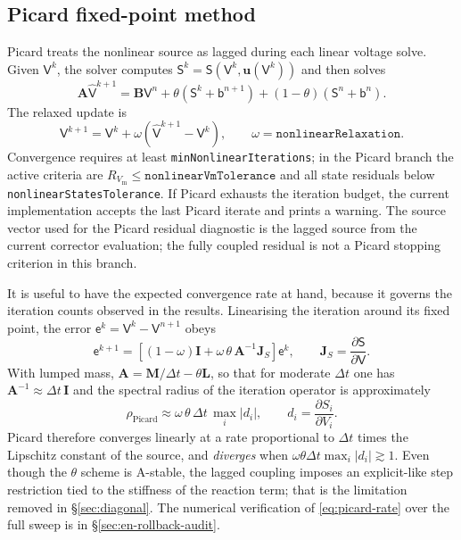 \documentclass[11pt,a4paper]{article}
\newcommand{\code}[1]{\texttt{\small #1}}
\newcommand{\Vm}{V_{\text{m}}}
\newcommand{\Mmass}{\mathbf{M}}
\newcommand{\Lop}{\mathbf{L}}
\newcommand{\Aimp}{\mathbf{A}}
\newcommand{\Bimp}{\mathbf{B}}
\begin{document}
\subsection{Picard fixed-point method}
\label{sec:picard}

Picard treats the nonlinear source as lagged during each linear voltage solve.
Given $\mathsf{V}^{k}$, the solver computes
$\mathsf{S}^{k}=\mathsf{S}(\mathsf{V}^{k},\mathbf{u}(\mathsf{V}^{k}))$ and then
solves
\begin{equation}
  \Aimp \widehat{\mathsf{V}}^{k+1}
  =
  \Bimp\mathsf{V}^{n}
  +\theta(\mathsf{S}^{k}+\mathsf{b}^{n+1})
  +(1-\theta)(\mathsf{S}^{n}+\mathsf{b}^{n}).
\end{equation}
The relaxed update is
\begin{equation}
  \mathsf{V}^{k+1}
  =
  \mathsf{V}^{k}
  +
  \omega\left(\widehat{\mathsf{V}}^{k+1}-\mathsf{V}^{k}\right),
  \qquad
  \omega=\texttt{nonlinearRelaxation}.
\end{equation}
Convergence requires at least \code{minNonlinearIterations}; in the Picard
branch the active criteria are $R_{\Vm}\le\texttt{nonlinearVmTolerance}$ and
all state residuals below \code{nonlinearStatesTolerance}. If Picard exhausts
the iteration budget, the current implementation accepts the last Picard
iterate and prints a warning.
The source vector used for the Picard residual diagnostic is the lagged source
from the current corrector evaluation; the fully coupled residual is not a
Picard stopping criterion in this branch.

It is useful to have the expected convergence rate at hand, because it governs
the iteration counts observed in the results. Linearising the iteration around
its fixed point, the error $\mathsf{e}^k=\mathsf{V}^k-\mathsf{V}^{n+1}$ obeys
\begin{equation}
  \mathsf{e}^{k+1}
  =
  \left[(1-\omega)\mathbf{I}+\omega\,\theta\,\Aimp^{-1}\mathbf{J}_S\right]\mathsf{e}^{k},
  \qquad
  \mathbf{J}_S=\frac{\partial\mathsf{S}}{\partial\mathsf{V}} .
\end{equation}
With lumped mass, $\Aimp=\Mmass/\Delta t-\theta\Lop$, so that for moderate
$\Delta t$ one has $\Aimp^{-1}\approx\Delta t\,\mathbf{I}$ and the spectral
radius of the iteration operator is approximately
\begin{equation}
  \rho_{\text{Picard}}
  \approx
  \omega\,\theta\,\Delta t\,\max_i\left|d_i\right|,
  \qquad
  d_i=\frac{\partial S_i}{\partial V_i}.
  \label{eq:picard-rate}
\end{equation}
Picard therefore converges linearly at a rate proportional to $\Delta t$ times
the Lipschitz constant of the source, and \emph{diverges} when
$\omega\theta\Delta t\max_i|d_i|\gtrsim1$. Even though the $\theta$ scheme is
A-stable, the lagged coupling imposes an explicit-like step restriction tied to
the stiffness of the reaction term; that is the limitation removed in
\S\ref{sec:diagonal}. The numerical verification of \eqref{eq:picard-rate} over
the full sweep is in \S\ref{sec:en-rollback-audit}.
\end{document}

